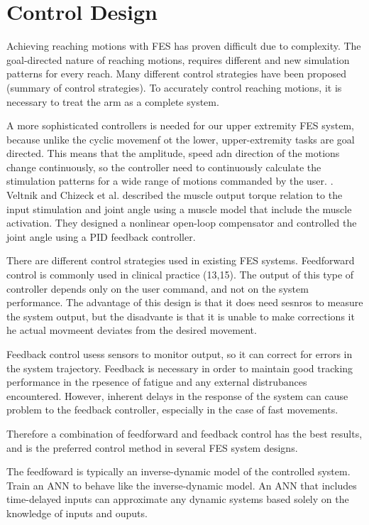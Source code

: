 \section{Control Design}
Achieving reaching motions with FES has proven difficult due to complexity. The goal-directed nature of reaching motions, requires different and new simulation patterns for every reach. Many different control strategies have been proposed (summary of control strategies). To accurately control reaching motions, it is necessary to treat the arm as a complete system. 




A more sophisticated controllers is needed for our upper extremity FES system, because unlike the cyclic movemenf ot the lower, upper-extremity tasks are goal directed. This means that the amplitude, speed adn direction of the motions change continuously, so the controller need to continuously calculate the stimulation patterns for a wide range of motions commanded by the user. \cite{CFF}. 
Veltnik and Chizeck et al. described the muscle output torque relation to the input stimulation and joint angle using a muscle model that include the muscle activation. They designed a nonlinear open-loop compensator and controlled the joint angle using a PID feedback controller. \cite{NNPID}



There are different control strategies used in existing FES systems. Feedforward control is commonly used in clinical practice (13,15). The output of this type of controller depends only on the user command, and not on the system performance. The advantage of this design is that it does need sesnros to measure the system output, but the disadvante is that it is unable to make corrections it he actual movmeent deviates from the desired movement. \cite{CFF}

Feedback control usess sensors to monitor output, so it can correct for errors in the system trajectory. Feedback is necessary in order to maintain good tracking performance in the rpesence of fatigue and any external distrubances encountered. However, inherent delays in the response of the system can cause problem to the feedback controller, especially in the case of fast movements. \cite{CFF}

Therefore a combination of feedforward and feedback control has the best results, and is the preferred control method in several FES system designs. 

The feedfoward is typically an inverse-dynamic model of the controlled system. Train an ANN to behave like the inverse-dynamic model. An ANN that includes time-delayed inputs can approximate any dynamic systems based solely on the knowledge of inputs and ouputs.

